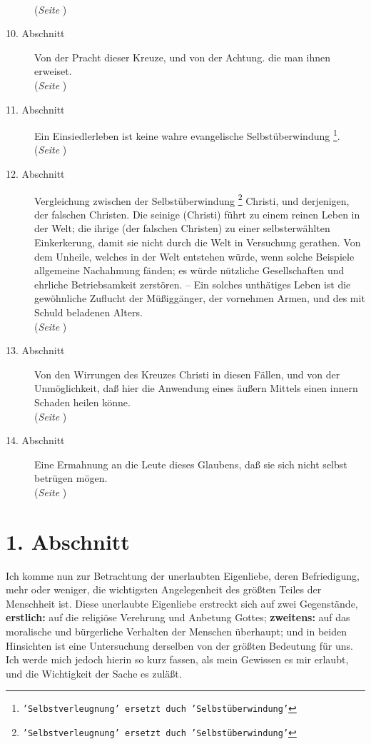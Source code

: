 \begin{description}
\\(\textit{Seite \pageref{kap5_ab9}})
\item[10. Abschnitt] Von der Pracht dieser Kreuze, und von der Achtung. die man
ihnen erweiset.
\\(\textit{Seite \pageref{kap5_ab10}})
\item[11. Abschnitt] Ein Einsiedlerleben ist keine wahre evangelische
Selbstüberwindung \footnote{\texttt{'Selbstverleugnung' ersetzt duch
'Selbstüberwindung'}}.
\\(\textit{Seite \pageref{kap5_ab11}})
\item[12. Abschnitt] Vergleichung zwischen der Selbstüberwindung
\footnote{\texttt{'Selbstverleugnung' ersetzt duch 'Selbstüberwindung'}} Christi, und
derjenigen, der falschen Christen. Die seinige (Christi) führt zu einem reinen
Leben in
der Welt; die ihrige (der falschen Christen) zu einer selbsterwählten
Einkerkerung, damit sie nicht
durch die Welt in Versuchung gerathen. Von dem Unheile, welches in der Welt
entstehen würde, wenn solche Beispiele allgemeine Nachahmung fänden; es würde
nützliche Gesellschaften und ehrliche Betriebsamkeit zerstören. -- Ein solches
unthätiges Leben ist die gewöhnliche Zuflucht der Müßiggänger, der vornehmen
Armen, und des mit Schuld beladenen Alters.
\\(\textit{Seite \pageref{kap5_ab12}})
\item[13. Abschnitt] Von den Wirrungen des Kreuzes Christi in diesen Fällen, und
von der Unmöglichkeit, daß hier die Anwendung eines äußern Mittels einen innern
Schaden heilen könne.
\\(\textit{Seite \pageref{kap5_ab13}})
\item[14. Abschnitt] Eine Ermahnung an die Leute dieses Glaubens, daß sie sich
nicht selbst betrügen mögen.
\\(\textit{Seite \pageref{kap5_ab14}})

\end{description}
\normalsize

\section{1. Abschnitt} \label{kap5_ab1}

Ich komme nun zur Betrachtung der unerlaubten Eigenliebe, deren Befriedigung,
mehr oder weniger, die wichtigsten Angelegenheit des größten Teiles der
Menschheit ist. Diese unerlaubte Eigenliebe erstreckt sich auf zwei Gegenstände,
\textbf{erstlich:} auf die religiöse Verehrung und Anbetung Gottes;
\textbf{zweitens:} auf das
moralische und bürgerliche Verhalten der Menschen überhaupt; und in beiden
Hinsichten ist eine Untersuchung derselben von der größten Bedeutung für uns.
Ich werde mich jedoch hierin so kurz fassen, als mein Gewissen es mir erlaubt,
und die Wichtigkeit der Sache es zuläßt.

